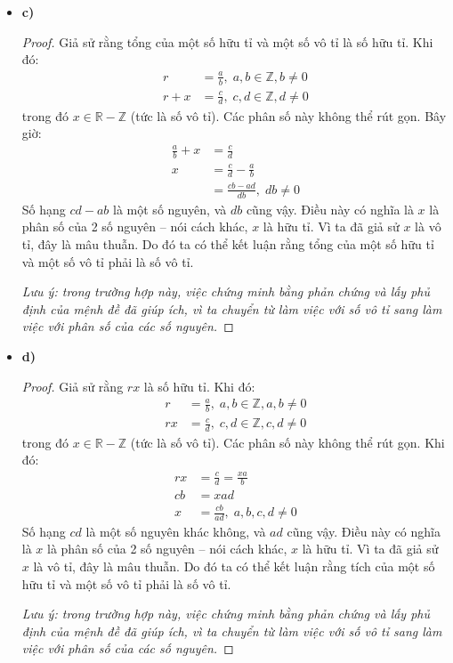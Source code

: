 \documentclass[12pt,a4paper]{article}
\theoremstyle{definition}
\begin{document}
\begin{itemize}
\item \textbf{c)}
\begin{proof}
Giả sử rằng tổng của một số hữu tỉ và một số vô tỉ là số hữu tỉ. Khi đó:
\begin{align}
r &= \frac{a}{b},\; a, b \in \mathbb{Z}, b \neq 0 \\
r + x &= \frac{c}{d},\; c, d \in \mathbb{Z}, d \neq 0
\end{align}
trong đó $x \in \mathbb{R} - \mathbb{Z}$ (tức là số vô tỉ). Các phân số này không thể rút gọn. Bây giờ:
\begin{align}
\frac{a}{b} + x &= \frac{c}{d} \\
x &= \frac{c}{d} - \frac{a}{b} \\
&= \frac{cb - ad}{db},\; db \neq 0
\end{align}
Số hạng $cd - ab$ là một số nguyên, và $db$ cũng vậy. Điều này có nghĩa là $x$ là phân số của 2 số nguyên -- nói cách khác, $x$ là hữu tỉ. Vì ta đã giả sử $x$ là vô tỉ, đây là mâu thuẫn. Do đó ta có thể kết luận rằng tổng của một số hữu tỉ và một số vô tỉ phải là số vô tỉ.

\textit{Lưu ý: trong trường hợp này, việc chứng minh bằng phản chứng và lấy phủ định của mệnh đề đã giúp ích, vì ta chuyển từ làm việc với số vô tỉ sang làm việc với phân số của các số nguyên.}
\end{proof}

\item \textbf{d)}
\begin{proof}
Giả sử rằng $rx$ là số hữu tỉ. Khi đó:
\begin{align}
r &= \frac{a}{b},\; a, b \in \mathbb{Z}, a, b \neq 0 \\
rx &= \frac{c}{d},\; c, d \in \mathbb{Z}, c, d \neq 0
\end{align}
trong đó $x \in \mathbb{R} - \mathbb{Z}$ (tức là số vô tỉ). Các phân số này không thể rút gọn. Khi đó:
\begin{align}
rx &= \frac{c}{d} = \frac{xa}{b} \\
cb &= xad \\
x &= \frac{cb}{ad},\; a, b, c, d \neq 0
\end{align}
Số hạng $cd$ là một số nguyên khác không, và $ad$ cũng vậy. Điều này có nghĩa là $x$ là phân số của 2 số nguyên -- nói cách khác, $x$ là hữu tỉ. Vì ta đã giả sử $x$ là vô tỉ, đây là mâu thuẫn. Do đó ta có thể kết luận rằng tích của một số hữu tỉ và một số vô tỉ phải là số vô tỉ.

\textit{Lưu ý: trong trường hợp này, việc chứng minh bằng phản chứng và lấy phủ định của mệnh đề đã giúp ích, vì ta chuyển từ làm việc với số vô tỉ sang làm việc với phân số của các số nguyên.}
\end{proof}


\end{itemize}
\end{document}
